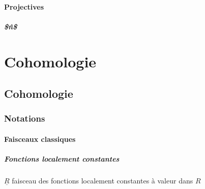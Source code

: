 \subsubsection{Projectives}

\paragraph{\$\Pro\^n\$}

\chapter{Cohomologie}


\section{Cohomologie}

\subsection{Notations}
%

\subsubsection{Faisceaux classiques}

\paragraph{Fonctions localement constantes}
$\underline{R}$ faisceau des fonctions localement constantes à valeur dans $R$
